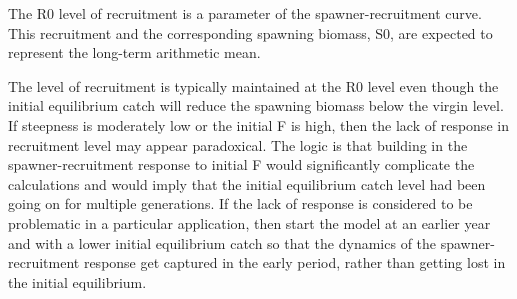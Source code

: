The R0 level of recruitment is a parameter of the spawner-recruitment curve.  This recruitment and the corresponding spawning biomass, S0, are expected to represent the long-term arithmetic mean.

The level of recruitment is typically maintained at the R0 level even though the initial equilibrium catch will reduce the spawning biomass below the virgin level.  If steepness is moderately low or the initial F is high, then the lack of response in recruitment level may appear paradoxical.  The logic is that building in the spawner-recruitment response to initial F would significantly complicate the calculations and would imply that the initial equilibrium catch level had been going on for multiple generations.  If the lack of response is considered to be problematic in a particular application, then start the model at an earlier year and with a lower initial equilibrium catch so that the dynamics of the spawner-recruitment response get captured in the early period, rather than getting lost in the initial equilibrium.

